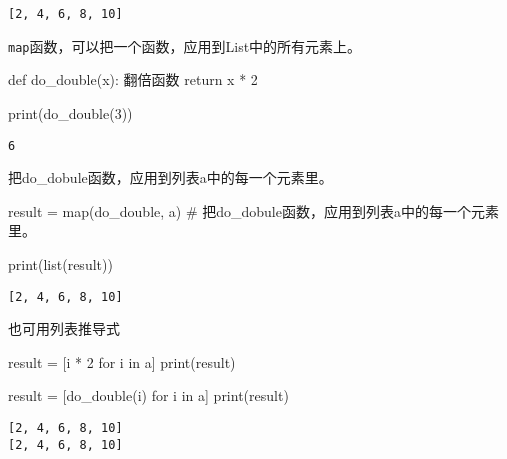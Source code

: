 \documentclass[
  letterpaper,
  DIV=11,
  numbers=noendperiod]{scrreprt}
\newenvironment{Shaded}{\begin{snugshade}}{\end{snugshade}}
\newcommand{\BuiltInTok}[1]{\textcolor[rgb]{0.00,0.23,0.31}{#1}}
\newcommand{\CommentTok}[1]{\textcolor[rgb]{0.37,0.37,0.37}{#1}}
\newcommand{\ControlFlowTok}[1]{\textcolor[rgb]{0.00,0.23,0.31}{#1}}
\newcommand{\DecValTok}[1]{\textcolor[rgb]{0.68,0.00,0.00}{#1}}
\newcommand{\KeywordTok}[1]{\textcolor[rgb]{0.00,0.23,0.31}{#1}}
\newcommand{\NormalTok}[1]{\textcolor[rgb]{0.00,0.23,0.31}{#1}}
\newcommand{\OperatorTok}[1]{\textcolor[rgb]{0.37,0.37,0.37}{#1}}
\begin{document}
\begin{verbatim}
[2, 4, 6, 8, 10]
\end{verbatim}

\texttt{map}函数，可以把一个函数，应用到List中的所有元素上。

\begin{Shaded}
\begin{Highlighting}[]
\KeywordTok{def}\NormalTok{ do\_double(x):}
    \CommentTok{\textquotesingle{}翻倍函数\textquotesingle{}}
    \ControlFlowTok{return}\NormalTok{ x }\OperatorTok{*} \DecValTok{2}

\BuiltInTok{print}\NormalTok{(do\_double(}\DecValTok{3}\NormalTok{))}
\end{Highlighting}
\end{Shaded}

\begin{verbatim}
6
\end{verbatim}

把do\_dobule函数，应用到列表a中的每一个元素里。

\begin{Shaded}
\begin{Highlighting}[]
\NormalTok{result }\OperatorTok{=} \BuiltInTok{map}\NormalTok{(do\_double, a) }\CommentTok{\# 把do\_dobule函数，应用到列表a中的每一个元素里。}

\BuiltInTok{print}\NormalTok{(}\BuiltInTok{list}\NormalTok{(result))}
\end{Highlighting}
\end{Shaded}

\begin{verbatim}
[2, 4, 6, 8, 10]
\end{verbatim}

也可用列表推导式

\begin{Shaded}
\begin{Highlighting}[]
\NormalTok{result }\OperatorTok{=}\NormalTok{ [i }\OperatorTok{*} \DecValTok{2} \ControlFlowTok{for}\NormalTok{ i }\KeywordTok{in}\NormalTok{ a]}
\BuiltInTok{print}\NormalTok{(result)}

\NormalTok{result }\OperatorTok{=}\NormalTok{ [do\_double(i) }\ControlFlowTok{for}\NormalTok{ i }\KeywordTok{in}\NormalTok{ a]}
\BuiltInTok{print}\NormalTok{(result)}
\end{Highlighting}
\end{Shaded}

\begin{verbatim}
[2, 4, 6, 8, 10]
[2, 4, 6, 8, 10]
\end{verbatim}
\end{document}
